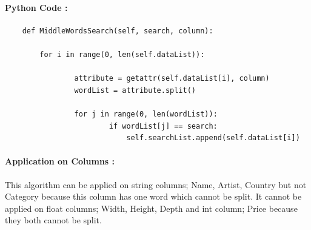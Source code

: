 \documentclass[12pt]{article}
\begin{document}
    \paragraph{Python Code :}
    \begin{verbatim}
    def MiddleWordsSearch(self, search, column):

        for i in range(0, len(self.dataList)):
                
                attribute = getattr(self.dataList[i], column)
                wordList = attribute.split()

                for j in range(0, len(wordList)):
                        if wordList[j] == search:
                            self.searchList.append(self.dataList[i])
    \end{verbatim}
    \paragraph{Application on Columns :} 
    This algorithm can be applied on string columns; Name, Artist, Country but not Category because this column has one word which cannot be split. It cannot be applied on float columns; Width, Height, Depth and int column; Price because they both cannot be split.
    
\end{document}
